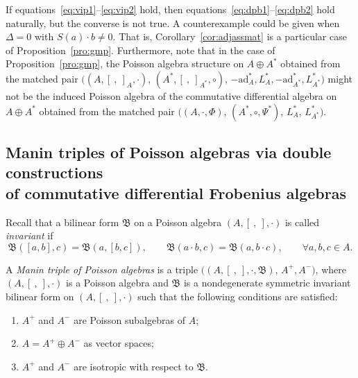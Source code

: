 \documentclass[pdftex]{sigma}
\numberwithin{equation}{section}
\newcommand{\ad}{\mathrm{ad}}
\begin{document}
\begin{Remark}
 If equations~\eqref{eq:vip1}--\eqref{eq:vip2} hold,
 then equations~\eqref{eq:dpb1}--\eqref{eq:dpb2} hold naturally, but the converse is not true.
 A counterexample could be given when $\Delta = 0$ with $S(a) \cdot b \neq 0$.
 That is, Corollary~\ref{cor:adjassmat} is a particular case of Proposition~\ref{pro:gmp}.
 Furthermore, note that in the case of Proposition~\ref{pro:gmp},
 the Poisson algebra structure on $A \oplus A^*$ obtained from the matched pair $((A, [\ ,\ ]_A, \cdot)$, $(A^*, [\ ,\ ]_{A^*}, \circ)$, $-\ad_A^*, L_A^*, -\ad_{A^*}^*, L_{A^*}^*)$ might not be
 the induced Poisson algebra of the commutative differential algebra on $A \oplus A^*$ obtained from the matched pair $((A, \cdot, \Phi)$, $(A^*, \circ, \Psi^*)$, $L_{A}^*$, $L_{A^*}^*)$.
\end{Remark}

\subsection[Manin triples of Poisson algebras via double constructions of commutative differential Frobenius algebras]{Manin triples of Poisson algebras via double constructions\\ of commutative differential Frobenius algebras}

Recall that a bilinear form $\mathfrak B$ on a Poisson algebra $(A, [\ ,\ ], \cdot)$ is called \textit{invariant} if
\begin{equation*}
	\mathfrak{B}([a, b], c) = \mathfrak{B}(a, [b, c]), \qquad \mathfrak{B}(a \cdot b, c) = \mathfrak{B}(a, b \cdot c), \qquad \forall a, b, c \in A.
\end{equation*}

\begin{Definition}
 A \textit{Manin triple of Poisson algebras} is a triple $((A, [\ ,\ ], \cdot, \mathfrak{B})$, $A^{+},
 A^{-})$,
 where $(A, [\ ,\ ], \cdot)$ is a Poisson algebra and $\mathfrak{B}$ is a nondegenerate symmetric invariant bilinear form on $(A, [\ ,\ ], \cdot)$ such that the following conditions are satisfied:
 \begin{enumerate}\itemsep=0pt
 \item[(1)] $A^{+}$ and $A^{-}$ are Poisson subalgebras of $A$;
 \item[(2)] $A = A^{+} \oplus A^{-}$ as vector spaces;
 \item[(3)]$A^{+}$ and $A^{-}$ are isotropic with respect to $\mathfrak{B}$.
 \end{enumerate}
\end{Definition}
\end{document}
